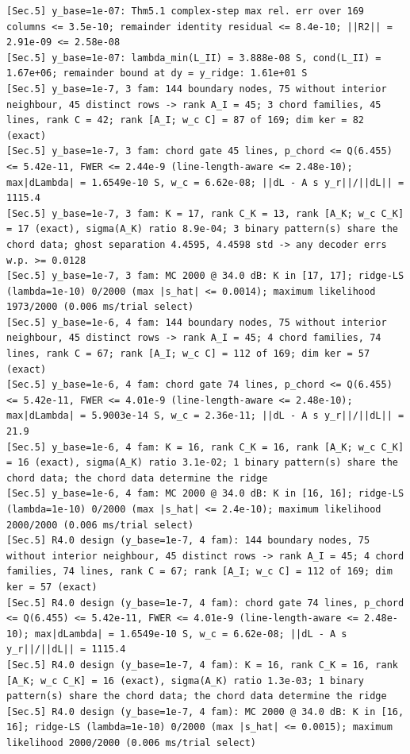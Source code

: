 \documentclass[11pt,a4paper]{article}
\theoremstyle{definition}
\theoremstyle{remark}
\begin{document}
\begin{lstlisting}[style=consolestyle]
[Sec.5] y_base=1e-07: Thm5.1 complex-step max rel. err over 169 columns <= 3.5e-10; remainder identity residual <= 8.4e-10; ||R2|| = 2.91e-09 <= 2.58e-08
[Sec.5] y_base=1e-07: lambda_min(L_II) = 3.888e-08 S, cond(L_II) = 1.67e+06; remainder bound at dy = y_ridge: 1.61e+01 S
[Sec.5] y_base=1e-7, 3 fam: 144 boundary nodes, 75 without interior neighbour, 45 distinct rows -> rank A_I = 45; 3 chord families, 45 lines, rank C = 42; rank [A_I; w_c C] = 87 of 169; dim ker = 82 (exact)
[Sec.5] y_base=1e-7, 3 fam: chord gate 45 lines, p_chord <= Q(6.455) <= 5.42e-11, FWER <= 2.44e-9 (line-length-aware <= 2.48e-10); max|dLambda| = 1.6549e-10 S, w_c = 6.62e-08; ||dL - A s y_r||/||dL|| = 1115.4
[Sec.5] y_base=1e-7, 3 fam: K = 17, rank C_K = 13, rank [A_K; w_c C_K] = 17 (exact), sigma(A_K) ratio 8.9e-04; 3 binary pattern(s) share the chord data; ghost separation 4.4595, 4.4598 std -> any decoder errs w.p. >= 0.0128
[Sec.5] y_base=1e-7, 3 fam: MC 2000 @ 34.0 dB: K in [17, 17]; ridge-LS (lambda=1e-10) 0/2000 (max |s_hat| <= 0.0014); maximum likelihood 1973/2000 (0.006 ms/trial select)
[Sec.5] y_base=1e-6, 4 fam: 144 boundary nodes, 75 without interior neighbour, 45 distinct rows -> rank A_I = 45; 4 chord families, 74 lines, rank C = 67; rank [A_I; w_c C] = 112 of 169; dim ker = 57 (exact)
[Sec.5] y_base=1e-6, 4 fam: chord gate 74 lines, p_chord <= Q(6.455) <= 5.42e-11, FWER <= 4.01e-9 (line-length-aware <= 2.48e-10); max|dLambda| = 5.9003e-14 S, w_c = 2.36e-11; ||dL - A s y_r||/||dL|| = 21.9
[Sec.5] y_base=1e-6, 4 fam: K = 16, rank C_K = 16, rank [A_K; w_c C_K] = 16 (exact), sigma(A_K) ratio 3.1e-02; 1 binary pattern(s) share the chord data; the chord data determine the ridge
[Sec.5] y_base=1e-6, 4 fam: MC 2000 @ 34.0 dB: K in [16, 16]; ridge-LS (lambda=1e-10) 0/2000 (max |s_hat| <= 2.4e-10); maximum likelihood 2000/2000 (0.006 ms/trial select)
[Sec.5] R4.0 design (y_base=1e-7, 4 fam): 144 boundary nodes, 75 without interior neighbour, 45 distinct rows -> rank A_I = 45; 4 chord families, 74 lines, rank C = 67; rank [A_I; w_c C] = 112 of 169; dim ker = 57 (exact)
[Sec.5] R4.0 design (y_base=1e-7, 4 fam): chord gate 74 lines, p_chord <= Q(6.455) <= 5.42e-11, FWER <= 4.01e-9 (line-length-aware <= 2.48e-10); max|dLambda| = 1.6549e-10 S, w_c = 6.62e-08; ||dL - A s y_r||/||dL|| = 1115.4
[Sec.5] R4.0 design (y_base=1e-7, 4 fam): K = 16, rank C_K = 16, rank [A_K; w_c C_K] = 16 (exact), sigma(A_K) ratio 1.3e-03; 1 binary pattern(s) share the chord data; the chord data determine the ridge
[Sec.5] R4.0 design (y_base=1e-7, 4 fam): MC 2000 @ 34.0 dB: K in [16, 16]; ridge-LS (lambda=1e-10) 0/2000 (max |s_hat| <= 0.0015); maximum likelihood 2000/2000 (0.006 ms/trial select)

\end{lstlisting}
\end{document}
